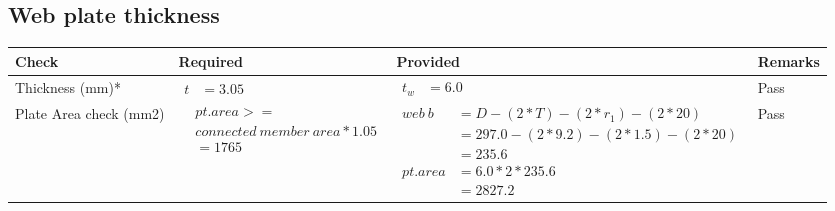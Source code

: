 \documentclass{article}%
\begin{document}
\subsection{Web plate thickness}%
\label{subsec:Webplatethickness}%
\renewcommand{\arraystretch}{1.2}%
\begin{longtable}{|p{2.5cm}|p{4.5cm}|p{7cm}|p{1.5cm}|}%
\hline%
\rowcolor{OsdagGreen}%
Check&Required&Provided&Remarks\\%
\hline%
\endhead%
\hline%
Thickness (mm)*&$\begin{aligned} t &=3.05\end{aligned}$&$\begin{aligned} t_w &=6.0\end{aligned}$&Pass\\%
\hline%
Plate Area check (mm2)&$\begin{aligned} &pt.area >= \\&connected~member~area * 1.05\\  &= 1765\end{aligned}$&$\begin{aligned} web~b &= D-(2*T)-(2*r_1)-(2*20)\\ &=297.0-(2*9.2)-(2*1.5)-(2*20)\\ &= 235.6 \\  pt.area &= 6.0*2* 235.6\\ &= 2827.2\end{aligned}$&Pass\\%
\hline%
\end{longtable}

%
\newpage%
\end{document}
